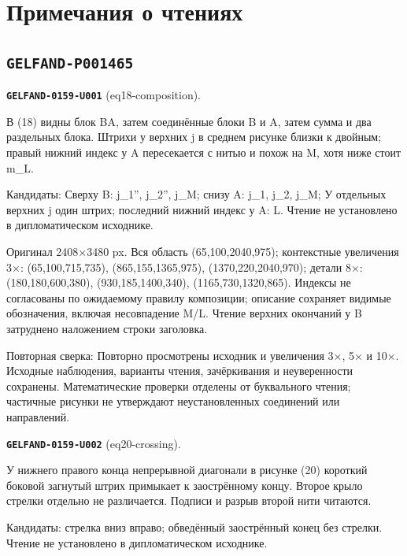 \section*{Примечания о чтениях}
\subsection*{\texttt{GELFAND-P001465}}
\par\noindent\leavevmode{}\label{GELFAND-0159-U001}\label{GELFAND-P001465:eq18-composition}\textbf{\texttt{GELFAND-0159-U001}} (eq18-composition).\nopagebreak[4]\par
В (18) видны блок BA, затем соединённые блоки B и A, затем сумма и два раздельных блока. Штрихи у верхних j в среднем рисунке близки к двойным; правый нижний индекс у A пересекается с нитью и похож на M, хотя ниже стоит m\_L.\par
Кандидаты: Сверху B: j\_1'', j\_2'', j\_M; снизу A: j\_1, j\_2, j\_M; У отдельных верхних j один штрих; последний нижний индекс у A: L. Чтение не установлено в дипломатическом исходнике.\par
Оригинал 2408×3480 px. Вся область (65,100,2040,975); контекстные увеличения 3×: (65,100,715,735), (865,155,1365,975), (1370,220,2040,970); детали 8×: (180,180,600,380), (930,185,1400,340), (1165,730,1320,865). Индексы не согласованы по ожидаемому правилу композиции; описание сохраняет видимые обозначения, включая несовпадение M/L. Чтение верхних окончаний у B затруднено наложением строки заголовка.\par
Повторная сверка: Повторно просмотрены исходник и увеличения 3×, 5× и 10×. Исходные наблюдения, варианты чтения, зачёркивания и неуверенности сохранены. Математические проверки отделены от буквального чтения; частичные рисунки не утверждают неустановленных соединений или направлений.\par\medskip
\par\noindent\leavevmode{}\label{GELFAND-0159-U002}\label{GELFAND-P001465:eq20-crossing}\textbf{\texttt{GELFAND-0159-U002}} (eq20-crossing).\nopagebreak[4]\par
У нижнего правого конца непрерывной диагонали в рисунке (20) короткий боковой загнутый штрих примыкает к заострённому концу. Второе крыло стрелки отдельно не различается. Подписи и разрыв второй нити читаются.\par
Кандидаты: стрелка вниз вправо; обведённый заострённый конец без стрелки. Чтение не установлено в дипломатическом исходнике.\par
